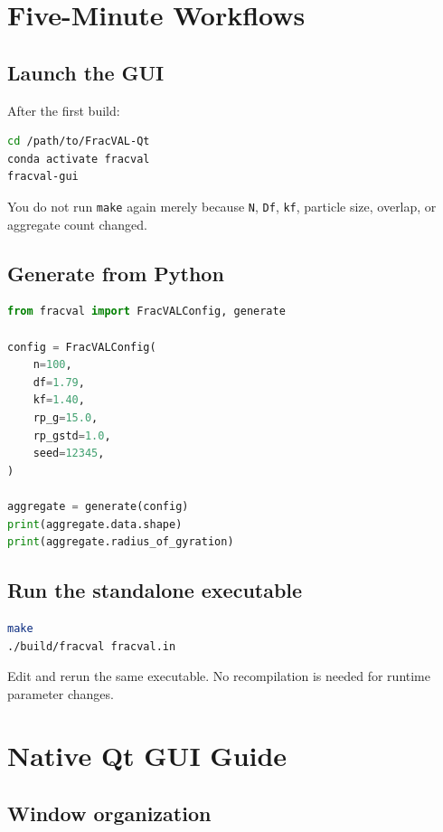 \documentclass[11pt,oneside]{report}
\newcommand{\code}[1]{\texttt{#1}}
\begin{document}
\chapter{Five-Minute Workflows}

\section{Launch the GUI}

After the first build:

\begin{lstlisting}[language=bash]
cd /path/to/FracVAL-Qt
conda activate fracval
fracval-gui
\end{lstlisting}

You do not run \code{make} again merely because \code{N}, \code{Df}, \code{kf},
particle size, overlap, or aggregate count changed.

\section{Generate from Python}

\begin{lstlisting}[language=Python]
from fracval import FracVALConfig, generate

config = FracVALConfig(
    n=100,
    df=1.79,
    kf=1.40,
    rp_g=15.0,
    rp_gstd=1.0,
    seed=12345,
)

aggregate = generate(config)
print(aggregate.data.shape)
print(aggregate.radius_of_gyration)
\end{lstlisting}

\section{Run the standalone executable}

\begin{lstlisting}[language=bash]
make
./build/fracval fracval.in
\end{lstlisting}

Edit  and rerun the same executable. No recompilation is
needed for runtime parameter changes.

\chapter{Native Qt GUI Guide}

\section{Window organization}
\end{document}
